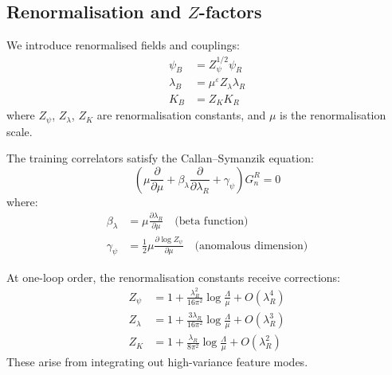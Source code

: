 \subsection{Renormalisation and $Z$-factors}

\begin{definition}
\label{def:bare_renormalised_fields}
We introduce renormalised fields and couplings:
\begin{align}
  \psi_B &= Z_\psi^{1/2} \psi_R \\
  \lambda_B &= \mu^\varepsilon Z_\lambda \lambda_R \\
  K_B &= Z_K K_R
\end{align}
where $Z_\psi$, $Z_\lambda$, $Z_K$ are renormalisation constants, and $\mu$ is the renormalisation scale.
\end{definition}

\begin{theorem}
\label{thm:callan_symanzik_training}
The training correlators satisfy the Callan--Symanzik equation:
\begin{equation}
  \left(\mu \frac{\partial}{\partial \mu} + \beta_\lambda \frac{\partial}{\partial \lambda_R} + \gamma_\psi \right) G_n^R = 0
  \label{eq:callan_symanzik}
\end{equation}
where:
\begin{align}
  \beta_\lambda &= \mu \frac{\partial \lambda_R}{\partial \mu} \quad \text{(beta function)} \\
  \gamma_\psi &= \frac{1}{2} \mu \frac{\partial \log Z_\psi}{\partial \mu} \quad \text{(anomalous dimension)}
\end{align}
\end{theorem}

\begin{proposition}
\label{prop:one_loop_corrections}
At one-loop order, the renormalisation constants receive corrections:
\begin{align}
  Z_\psi &= 1 + \frac{\lambda_R^2}{16\pi^2} \log \frac{\Lambda}{\mu} + O(\lambda_R^4) \\
  Z_\lambda &= 1 + \frac{3\lambda_R}{16\pi^2} \log \frac{\Lambda}{\mu} + O(\lambda_R^3) \\
  Z_K &= 1 + \frac{\lambda_R}{8\pi^2} \log \frac{\Lambda}{\mu} + O(\lambda_R^2)
\end{align}
These arise from integrating out high-variance feature modes.
\end{proposition}

